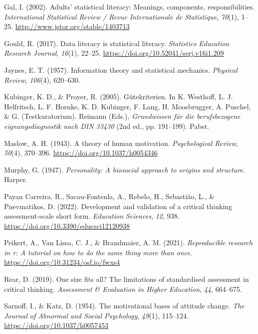 \documentclass[
  12pt,
  a4paper,
  twoside]{article}
\newlength{\cslhangindent}
\newenvironment{CSLReferences}[2] %
 {\begin{list}{}{%
  \setlength{\itemindent}{0pt}
  \setlength{\leftmargin}{0pt}
  \setlength{\parsep}{0pt}
  \ifodd #1
   \setlength{\leftmargin}{\cslhangindent}
   \setlength{\itemindent}{-1\cslhangindent}
  \fi
  \setlength{\itemsep}{#2\baselineskip}}}
 {\end{list}}
\begin{document}
\begin{CSLReferences}{1}{0}
Gal, I. (2002). Adults' statistical literacy: Meanings, components, responsibilities. \emph{International Statistical Review / Revue Internationale de Statistique}, \emph{70}(1), 1--25. \url{http://www.jstor.org/stable/1403713}

Gould, R. (2017). Data literacy is statistical literacy. \emph{Statistics Education Research Journal}, \emph{16}(1), 22--25. \url{https://doi.org/10.52041/serj.v16i1.209}

Jaynes, E. T. (1957). Information theory and statistical mechanics. \emph{Physical Review}, \emph{106}(4), 620--630.

Kubinger, K. D., \& Proyer, R. (2005). Gütekriterien. In K. Westhoff, L. J. Helfritsch, L. F. Hornke, K. D. Kubinger, F. Lang, H. Moosbrugger, A. Puschel, \& G. (Testkuratorium). Reimann (Eds.), \emph{Grundwissen für die berufsbezogene eignungsdiagnostik nach DIN 33430} (2nd ed., pp. 191--199). Pabst.

Maslow, A. H. (1943). A theory of human motivation. \emph{Psychological Review}, \emph{50}(4), 370--396. \url{https://doi.org/10.1037/h0054346}

Murphy, G. (1947). \emph{Personality: A biosocial approach to origins and structure}. Harper.

Payan Carreira, R., Sacau-Fontenla, A., Rebelo, H., Sebastião, L., \& Pnevmatikos, D. (2022). Development and validation of a critical thinking assessment-scale short form. \emph{Education Sciences}, \emph{12}, 938. \url{https://doi.org/10.3390/educsci12120938}

Peikert, A., Van Lissa, C. J., \& Brandmaier, A. M. (2021). \emph{Reproducible research in r: A tutorial on how to do the same thing more than once}. \url{https://doi.org/10.31234/osf.io/fwxs4}

Rear, D. (2019). One size fits all? The limitations of standardised assessment in critical thinking. \emph{Assessment \& Evaluation in Higher Education}, \emph{44}, 664--675.

Sarnoff, I., \& Katz, D. (1954). The motivational bases of attitude change. \emph{The Journal of Abnormal and Social Psychology}, \emph{49}(1), 115--124. \url{https://doi.org/10.1037/h0057453}


\end{CSLReferences}
\end{document}
